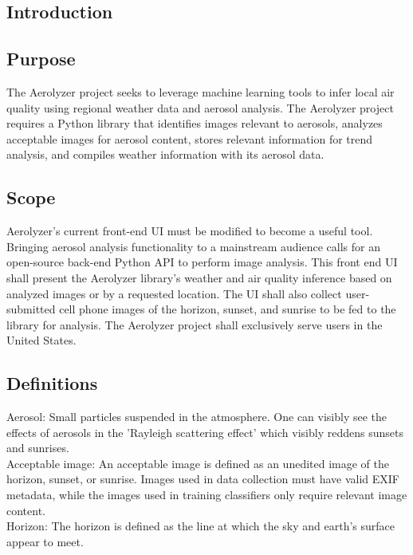\documentclass[journal,10pt,draftclsnofoot,onecolumn]{IEEEtran}
\begin{document}
\begin{singlespace}

\section{Introduction}

\subsection{Purpose}
The Aerolyzer project seeks to leverage machine learning tools to infer local air quality using regional weather data and aerosol analysis.
The Aerolyzer project requires a Python library that identifies images relevant to aerosols, analyzes acceptable images for aerosol content, stores relevant information for trend analysis, and compiles weather information with its aerosol data. 

\subsection{Scope}
Aerolyzer's current front-end UI must be modified to become a useful tool. Bringing aerosol analysis functionality to a mainstream audience calls for an open-source back-end Python API to perform image analysis.
This front end UI shall present the Aerolyzer library's weather and air quality inference based on analyzed images or by a requested location.
The UI shall also collect user-submitted cell phone images of the horizon, sunset, and sunrise to be fed to the library for analysis.
The Aerolyzer project shall exclusively serve users in the United States.

\subsection{Definitions}
Aerosol: Small particles suspended in the atmosphere.
One can visibly see the effects of aerosols in the 'Rayleigh scattering effect' which visibly reddens sunsets and sunrises. \\

Acceptable image: An acceptable image is defined as an unedited image of the horizon, sunset, or sunrise.
Images used in data collection must have valid EXIF metadata, while the images used in training classifiers only require relevant image content.\\

Horizon: The horizon is defined as the line at which the sky and earth's surface appear to meet.\\


\end{singlespace}
\end{document}
